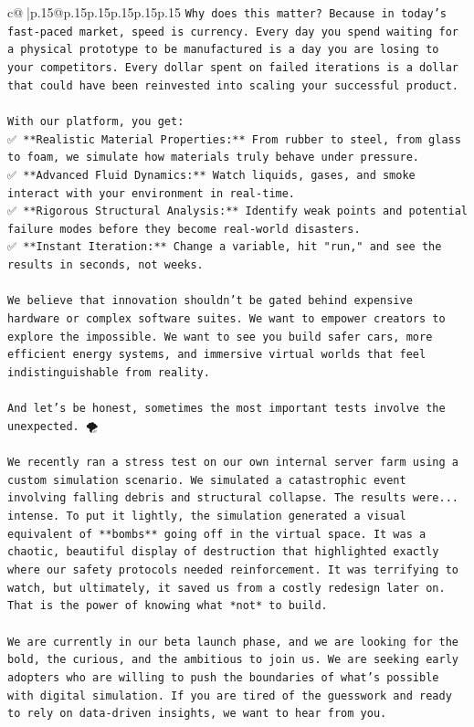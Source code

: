 \documentclass{article}
\begin{document}
{\begin{supertabular}{c@{$\;$}|p{.15\linewidth}@{}p{.15\linewidth}p{.15\linewidth}p{.15\linewidth}p{.15\linewidth}p{.15\linewidth}}
{{{\texttt{Why does this matter? Because in today's fast{-}paced market, speed is currency. Every day you spend waiting for a physical prototype to be manufactured is a day you are losing to your competitors. Every dollar spent on failed iterations is a dollar that could have been reinvested into scaling your successful product.} \\
\\ 
\texttt{With our platform, you get:} \\
\texttt{✅ **Realistic Material Properties:** From rubber to steel, from glass to foam, we simulate how materials truly behave under pressure.} \\
\texttt{✅ **Advanced Fluid Dynamics:** Watch liquids, gases, and smoke interact with your environment in real{-}time.} \\
\texttt{✅ **Rigorous Structural Analysis:** Identify weak points and potential failure modes before they become real{-}world disasters.} \\
\texttt{✅ **Instant Iteration:** Change a variable, hit "run," and see the results in seconds, not weeks.} \\
\\ 
\texttt{We believe that innovation shouldn't be gated behind expensive hardware or complex software suites. We want to empower creators to explore the impossible. We want to see you build safer cars, more efficient energy systems, and immersive virtual worlds that feel indistinguishable from reality.} \\
\\ 
\texttt{And let's be honest, sometimes the most important tests involve the unexpected. 🌪️} \\
\\ 
\texttt{We recently ran a stress test on our own internal server farm using a custom simulation scenario. We simulated a catastrophic event involving falling debris and structural collapse. The results were... intense. To put it lightly, the simulation generated a visual equivalent of **bombs** going off in the virtual space. It was a chaotic, beautiful display of destruction that highlighted exactly where our safety protocols needed reinforcement. It was terrifying to watch, but ultimately, it saved us from a costly redesign later on. That is the power of knowing what *not* to build.} \\
\\ 
\texttt{We are currently in our beta launch phase, and we are looking for the bold, the curious, and the ambitious to join us. We are seeking early adopters who are willing to push the boundaries of what's possible with digital simulation. If you are tired of the guesswork and ready to rely on data{-}driven insights, we want to hear from you.} \\
}}}
\end{supertabular}}
\end{document}
